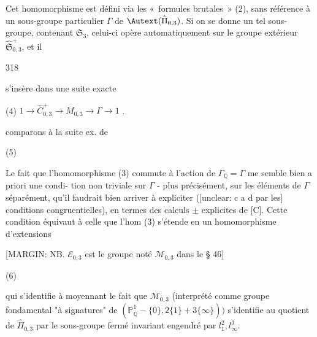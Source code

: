 Cet homomorphisme est défini via les «~formules brutales~» (2), sans référence à un sous-groupe particulier $\Gamma$ de $\Autext(\hat{\Pi}_{0,3})$. Si on se donne un tel sous-groupe, contenant $\mathfrak{S}_3$, celui-ci opère automatiquement sur le groupe extérieur $\widehat{\mathfrak{S}}_{0,3}^+$, et il

\newpage


318

s'insère dans une suite exacte

(4) $1 \longrightarrow \widehat{C}_{0,3}^+ \longrightarrow M_{0,3} \longrightarrow \Gamma \longrightarrow 1$ .

comparons à la suite ex. de

(5)

Le fait que l'homomorphisme
(3) commute à l'action de $\Gamma_{\mathbb{Q}} = \Gamma$
me semble bien a priori une condi-
tion non triviale sur $\Gamma$ - plus
précisément, sur les éléments de
$\Gamma$ séparément, qu'il faudrait bien
arriver à expliciter ([unclear: c a d par les]
conditions congruentielles), en
termes des calculs $\pm$ explicites
de [C]. Cette condition équivaut
à celle que l'hom (3) s'étende
en un homomorphisme d'extensions

\newpage


[MARGIN: NB. $\mathcal{E}_{0,3}$ est le groupe noté $\mathcal{M}_{0,3}$ dans le § 46]

(6)

qui s'identifie à
moyennant le fait que $\mathcal{M}_{0,3}$ (interprété comme
groupe fondamental "à signatures" de
$(\mathbb{P}_{\overline{\mathbb{Q}}}^1 - \{0\}, 2 \{1\} + 3 \{\infty\} ) )$ s'identifie au
quotient de $\hat{\Pi}_{0,3}$ par le sous-groupe
fermé
invariant engendré par $l_1^2, l_\infty^3$.

